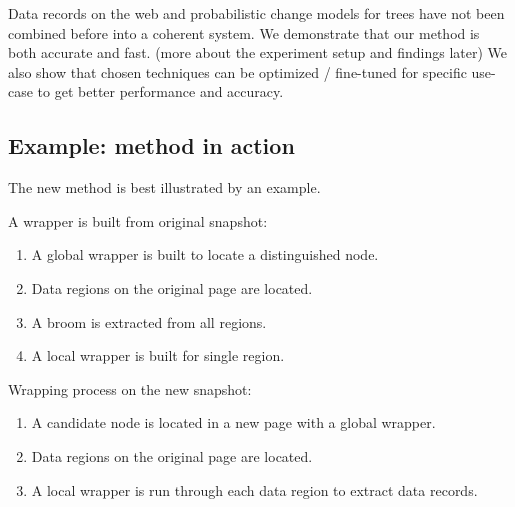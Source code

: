 
Data records on the web and probabilistic change models for trees have not been combined before into a coherent system. We demonstrate that our method is both accurate and fast. (more about the experiment setup and findings later) We also show that chosen techniques can be optimized / fine-tuned for specific use-case to get better performance and accuracy.



\subsection{Example: method in action}

The new method is best illustrated by an example.

A wrapper is built from original snapshot:

\begin{enumerate}
	\item A global wrapper is built to locate a distinguished node.
	\item Data regions on the original page are located.
	\item A broom is extracted from all regions.
	\item A local wrapper is built for single region.
\end{enumerate}

Wrapping process on the new snapshot:

\begin{enumerate}
	\item A candidate node is located in a new page with a global wrapper.
	\item Data regions on the original page are located.
	\item A local wrapper is run through each data region to extract data records.
\end{enumerate}




